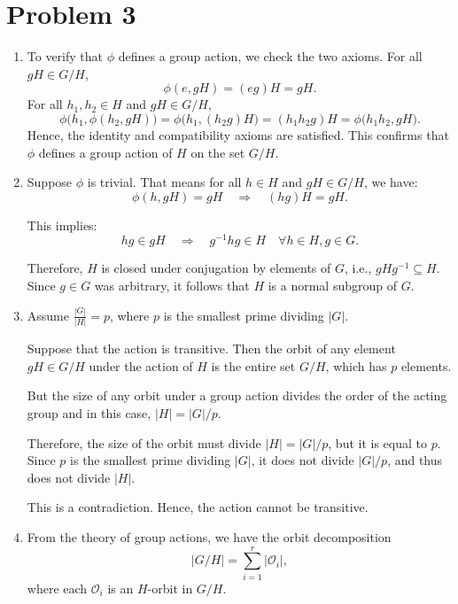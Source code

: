 \documentclass[12pt]{article}
\begin{document}
\section*{Problem 3}

\begin{enumerate}[label=(\arabic*)] 

\item To verify that \( \phi \) defines a group action, we check the two axioms. For all \( gH \in G/H \), 
\[
\phi(e,gH)=(eg)H = gH .
\]
For all \( h_1, h_2 \in H \) and \( gH \in G/H \), 
\[
\phi\bigl(h_1,\phi(h_2,gH)\bigr)
     =\phi\bigl(h_1,(h_2g)H\bigr)
     =(h_1h_2g)H
     =\phi\bigl(h_1h_2,gH\bigr).
\]
Hence, the identity and compatibility axioms are satisfied. This confirms that \( \phi \) defines a group action of \( H \) on the set \( G/H \).

\item

Suppose $\phi$ is trivial. That means for all \( h \in H \) and \( gH \in G/H \), we have:
\[
\phi(h, gH) = gH \quad \Rightarrow \quad (hg)H = gH.
\]

This implies:
\[
hg \in gH \quad \Rightarrow \quad g^{-1} h g \in H \quad \forall h \in H, g \in G.
\]

Therefore, \( H \) is closed under conjugation by elements of \( G \), i.e., \( gHg^{-1} \subseteq H \). 
Since \( g \in G \) was arbitrary, it follows that \(H\) is a normal subgroup of \(G\).

\item

Assume \( \frac{|G|}{|H|} = p \), where \( p \) is the smallest prime dividing \( |G| \).

Suppose that the action is transitive. Then the orbit of any element \( gH \in G/H \) under the action of \( H \) is the entire set \( G/H \), which has \( p \) elements.

But the size of any orbit under a group action divides the order of the acting group and in this case, \( |H| = |G|/p \).

Therefore, the size of the orbit must divide \( |H| = |G|/p \), but it is equal to \( p \). Since \( p \) is the smallest prime dividing \( |G| \), it does not divide \( |G|/p \), and thus does not divide \( |H| \).

This is a contradiction. Hence, the action cannot be transitive.

\item

From the theory of group actions, we have the orbit decomposition
\[
|G/H| = \sum_{i=1}^r |\mathcal{O}_i|,
\]
where each \(\mathcal{O}_i\) is an \(H\)-orbit in \(G/H\).


\end{enumerate}
\end{document}
